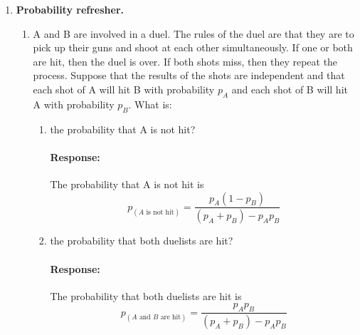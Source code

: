 \documentclass [11pt] {article}
\newcommand{\A}{\bf{A}}
\newenvironment{response}{\begin{responseframe}\vspace{-10pt}\paragraph{Response:}}{\end{responseframe}}
\renewcommand{\bf}[1]{\textbf{{#1}}}
\begin{document}
\begin{enumerate}
\begin{enumerate}
\begin{enumerate}[itemsep=10pt]
                        \newpage
                    \item A non-zero sum of two eigenvectors of a matrix $\A$ corresponding to the
                        same eigenvalue $\lambda$ is always an eigenvector.
                        \begin{response}
                            True. Consider two eigenvectors $\bf{x}, \bf{y}$ of a matrix
                            $\A$ and suppose $\bf{x}, \bf{y}$ correspond to the same eigenvalue $\lambda$. 
                            Then
                            \[\A(\bf{x} + \bf{y}) = \A \bf{x} + \A \bf{y} = \lambda \bf{x} + \lambda \bf{y} = \lambda(\bf{x} + \bf{y})\]
                        \end{response}
                \end{enumerate}
        \end{enumerate}
    \item \bf{Probability refresher.}
        \begin{enumerate}
            \item A and B are involved in a duel. The rules of the duel are that they are to
                pick up their guns and shoot at each other simultaneously. If one or both are hit, 
                then the duel is over. If both shots miss, then they repeat the process. Suppose 
                that the results of the shots are independent and that each shot of A will hit B 
                with probability $p_A$ and each shot of B will hit A with probability $p_B$. What
                is:
                \begin{enumerate}[itemsep=10pt]
                    \item the probability that A is not hit?
                        \begin{response}
                            The probability that A is not hit is 
                            \vspace{-5pt}
                            \[p_{(A \text{ is not hit})} = \frac{p_A \left( 1 - p_B \right)}{(p_A + p_B) - p_A p_B}\]
                        \end{response}

                    \item the probability that both duelists are hit?
                        \begin{response}
                            The probability that both duelists are hit is 
                            \vspace{-5pt}
                            \[p_{(A \text{ and } B \text{ are hit})} = \frac{p_A p_B}{(p_A + p_B) - p_A p_B}\]
                        \end{response}


\end{enumerate}
\end{enumerate}
\end{enumerate}
\end{document}
